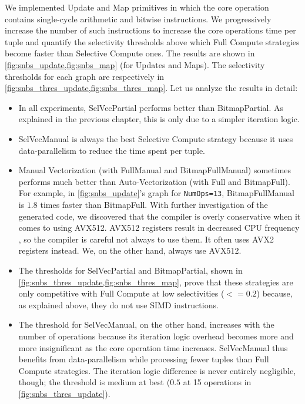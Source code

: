 \documentclass[12pt]{cmuthesis}
\begin{document}
We implemented Update and Map primitives in which the core operation contains single-cycle arithmetic and bitwise instructions. We progressively increase the number of such instructions to increase the core operations time per tuple and quantify the selectivity thresholds above which Full Compute strategies become faster than Selective Compute ones. The results are shown in \cref{fig:snbs_update,fig:snbs_map} (for Updates and Maps). The selectivity thresholds for each graph are respectively in \cref{fig:snbs_thres_update,fig:snbs_thres_map}. Let us analyze the results in detail:
\begin{itemize}
    \item In all experiments, SelVecPartial performs better than BitmapPartial. As explained in the previous chapter, this is only due to a simpler iteration logic.
    \item SelVecManual is always the best Selective Compute strategy because it uses data-parallelism to reduce the time spent per tuple.
    \item Manual Vectorization (with FullManual and BitmapFullManual) sometimes performs much better than Auto-Vectorization (with Full and BitmapFull). For example, in \cref{fig:snbs_update}'s graph for \texttt{NumOps=13}, BitmapFullManual is $1.8$ times faster than BitmapFull. With further investigation of the generated code, we discovered that the compiler is overly conservative when it comes to using AVX512. AVX512 registers result in decreased CPU frequency \cite{avx512_registers}, so the compiler is careful not always to use them. It often uses AVX2 registers instead. We, on the other hand, always use AVX512.
    \item The thresholds for SelVecPartial and BitmapPartial, shown in \cref{fig:snbs_thres_update,fig:snbs_thres_map}, prove that these strategies are only competitive with Full Compute at low selectivities ($<= 0.2$) because, as explained above, they do not use SIMD instructions.
    \item The threshold for SelVecManual, on the other hand, increases with the number of operations because its iteration logic overhead becomes more and more insignificant as the core operation time increases. SelVecManual thus benefits from data-parallelism while processing fewer tuples than Full Compute strategies. The iteration logic difference is never entirely negligible, though; the threshold is medium at best ($0.5$ at 15 operations in \cref{fig:snbs_thres_update}). 
\end{itemize}
\end{document}

